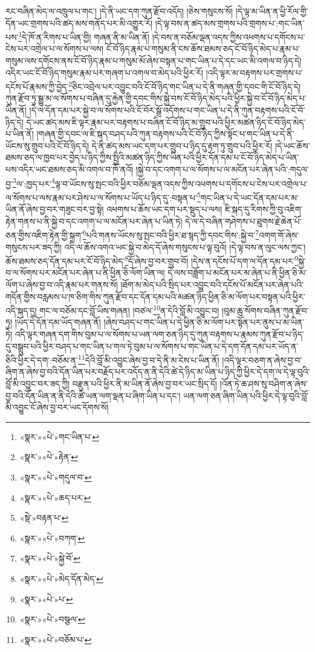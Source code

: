 རང་བཞིན་མེད་ལ་འཁྲུལ་པ་གང་། །དེ་ནི་ཡང་དག་ཀུན་རྫོབ་འདོད། །ཅེས་གསུངས་སོ། །དེ་ལྟ་མ་ཡིན་ན་ཕྱི་རོལ་གྱི་དོན་ཡང་གྲགས་པའི་ཚད་མས་གནོད་པར་མི་འགྱུར་རོ། །དེ་ལྟ་བས་ན་ཚད་མས་གྲགས་པའི་གྲགས་པ་:གང་ཡིན་པས་\footnote{«སྣར་»«པེ་»གང་ཡིན་པ་}དེ་ཁོ་ན་རིགས་པ་ཡིན་གྱི། གཞན་ནི་མ་ཡིན་ནོ། །དེ་བས་ན་བཅོམ་ལྡན་འདས་ཀྱིས་འཕགས་པ་དགོངས་པ་ངེས་པར་འགྲེལ་པ་ལ་སོགས་པ་ལས། ངོ་བོ་ཉིད་རྣམ་པ་གསུམ་ནི་ངས་ཆོས་ཐམས་ཅད་ངོ་བོ་ཉིད་མེད་པ་རྣམ་པ་གསུམ་ལས་དགོངས་ནས་ངོ་བོ་ཉིད་རྣམ་པ་གསུམ་མོ་ཞེས་བསྟན་པ་གང་ཡིན་པ་དེ་དང་ཡང་མི་འགལ་བ་ཉིད་དེ། འདིར་ཡང་ངོ་བོ་ཉིད་གསུམ་རྣམ་པར་གཞག་པ་འགལ་བ་མེད་པའི་ཕྱིར་རོ། །འདི་ལྟར་མ་བརྟགས་པར་གྲགས་པ་དངོས་པོ་རྣམས་ཀྱི་བྱེད་\footnote{«སྣར་»«པེ་»རྟེན་}ཅིང་འབྲེལ་པར་འབྱུང་བའི་ངོ་བོ་ཉིད་གང་ཡིན་པ་དེ་ནི་གཞན་གྱི་དབང་གི་ངོ་བོ་ཉིད་དེ། ཀུན་རྫོབ་ཏུ་སྒྱུ་མ་ལ་སོགས་པ་བཞིན་དུ་རྐྱེན་གྱི་དབང་གིས་སྐྱེ་བས་ངོ་བོ་ཉིད་མེད་པའི་ཕྱིར་སྐྱེ་བ་ངོ་བོ་ཉིད་མེད་པ་ཡིན་ནོ། །དེ་ལ་དོན་དམ་པར་སྐྱེ་བ་ལ་སོགས་པའི་ངོ་བོར་སྒྲོ་འདོགས་པ་གང་ཡིན་པ་དེ་ནི་ཀུན་བརྟགས་པའི་ངོ་བོ་ཉིད་དེ། དེ་ཡང་ཚད་མས་ཇི་ལྟར་རྣམ་པར་བརྟགས་པ་བཞིན་ངོ་བོ་ཉིད་མ་གྲུབ་པའི་ཕྱིར་མཚན་ཉིད་ངོ་བོ་ཉིད་མེད་པ་ཡིན་ནོ། །གཞན་གྱི་དབང་ལ་ཇི་སྐད་བཤད་པའི་ཀུན་བརྟགས་པའི་ངོ་བོ་ཉིད་ཀྱིས་སྟོང་པ་གང་ཡིན་པ་དེ་ནི་ཡོངས་སུ་གྲུབ་པའི་ངོ་བོ་ཉིད་དེ། དེ་ནི་ཚད་མས་ཡང་དག་པར་གྲུབ་པ་ཉིད་དུ་རྟག་ཏུ་གྲུབ་པའི་ཕྱིར་རོ། །དེ་ཡང་ཆོས་ཐམས་ཅད་ལ་ཁྱབ་པར་བྱེད་པ་ཉིད་ཀྱིས་སྤྱིའི་མཚན་ཉིད་ཀྱིས་ཡིན་པའི་ཕྱིར་དོན་དམ་པ་ངོ་བོ་ཉིད་མེད་པ་ཡིན་པས་འདིར་ཡང་ཐམས་ཅད་མི་འགལ་བ་ཁོ་ནའོ། །སྐྱེ་བ་དང་འགག་པ་ལ་སོགས་པ་ལ་མངོན་པར་ཞེན་པའི་:གདུལ་བྱ་\footnote{«སྣར་»«པེ་»གདུལ་བ་}ལ་:ཁྱད་པར་\footnote{«སྣར་»«པེ་»ཆད་པར་}ལྟ་བ་ཡོངས་སུ་སྤང་བའི་ཕྱིར་བཅོམ་ལྡན་འདས་ཀྱིས་འཕགས་པ་དགོངས་པ་ངེས་པར་འགྲེལ་པ་ལ་སོགས་པ་ལས་རྣམ་པར་ཤེས་པ་ལ་སོགས་པ་ཡོད་པ་ཉིད་དུ་:བསྟན་པ་\footnote{«སྡེ་»བརྟན་པ་}གང་ཡིན་པ་དེ་ཡང་དོན་དམ་པར་མ་ཡིན་ནོ་ཞེས་བྱ་བར་གཟུང་བར་བྱ་སྟེ། འཕགས་པ་ཆོས་ཡང་དག་པར་སྡུད་པ་ལས། ཇི་སྐད་དུ་རིགས་ཀྱི་བུ་འཇིག་རྟེན་གནས་པ་ནི་སྐྱེ་བ་དང་འགག་པ་ལ་མངོན་པར་ཞེན་པ་ཡིན་ཏེ། དེ་ལ་དེ་བཞིན་གཤེགས་པ་ཐུགས་རྗེ་ཆེན་པོ་ཅན་གྱིས་འཇིག་རྟེན་གྱི་སྐྲག་\footnote{«སྣར་»«པེ་»བཀག་}པའི་གནས་ཡོངས་སུ་སྤང་བའི་ཕྱིར་ཐ་སྙད་ཀྱི་དབང་གིས་:སྐྱེ་བ་\footnote{«སྣར་»«པེ་»སྐྱེ་བོ་}འགག་གོ་ཞེས་གསུངས་པར་ཟད་ཀྱི། འདི་ལ་ཆོས་འགའ་ཡང་སྐྱེ་བ་མེད་དོ་ཞེས་གསུངས་པ་ལྟ་བུའོ། །དེ་ལྟ་བས་ན་ལུང་ལས་ཀྱང་། ཆོས་ཐམས་ཅད་དོན་དམ་པར་ངོ་བོ་ཉིད་མེད་\footnote{«སྣར་»«པེ་»མེད་དོན་མེད་}དོ་ཞེས་བྱ་བར་གྲུབ་བོ། །དེས་ན་དངོས་པོ་དག་ལ་དོན་དམ་པར་\footnote{«སྣར་»«པེ་»པ་}སྐྱེ་བ་ལ་སོགས་པར་མངོན་པར་ཞེན་པ་ནི་ཕྱིན་ཅི་ལོག་ཡིན་ལ། དེ་ལས་བཟློག་པ་མངོན་པར་མ་ཞེན་པ་ནི་ཕྱིན་ཅི་མ་ལོག་པ་ཞེས་བྱ་བ་འདི་རྣམ་པར་གནས་སོ། །ཐོག་མ་མེད་པའི་སྲིད་པར་འབྱུང་བའི་དངོས་པོ་མངོན་པར་ཞེན་པའི་གདོན་གྱིས་བརླམས་པ་ཁ་ཅིག་གིས་ཀུན་རྫོབ་དང་དོན་དམ་པའི་མཚན་ཉིད་ཕྱིན་ཅི་མ་ལོག་པར་བསྟན་པའི་ཕྱིར་འདི་སྐད་དུ། གང་ལ་བཅོམ་དང་བློ་ཡིས་གཞན། །བཙལ་\footnote{«སྣར་»«པེ་»བསྩལ་}ན་དེའི་བློ་མི་འབྱུང་བ། །བུམ་ཆུ་སོགས་བཞིན་ཀུན་རྫོབ་ཏུ། །ཡོད་དེ་དོན་དམ་ཡོད་གཞན་ནོ། །ཞེས་བཤད་པ་གང་ཡིན་པ་དེ་ཕྱིན་ཅི་མ་ལོག་པར་སྟོན་པར་ནུས་པ་མ་ཡིན་ཏེ། འདི་ལྟར་གཞན་དག་གིས་བུམ་པ་ལ་སོགས་པ་ཡན་ལག་ཅན་ཉིད་དུ་ཀུན་བརྟགས་པ་རྣམས་ཀུན་རྫོབ་པ་ཉིད་དུ་བསྒྲུབ་པའི་ཕྱིར་བཤད་པ་གང་ཡིན་པ་གལ་ཏེ་བུམ་པ་ལ་སོགས་པ་གང་ཡིན་པ་དེ་དག་དོན་དམ་པར་ཡོད་ན་ཅིའི་ཕྱིར་དེ་དག་:བཅོམ་ན་\footnote{«སྣར་»«པེ་»བཅོམ་པ་}དེའི་བློ་མི་འབྱུང་ཞེས་བྱ་བ་དེ་ནི་མ་ངེས་པ་ཡིན་ནོ། །འདི་ལྟར་བཅག་ན་ཞེས་བྱ་བ་ཞིག་ན་ཞེས་བྱ་བའི་དོན་ཡིན་པར་བརྗོད་པར་འདོད་ན་ནི་དེའི་ཚེ་དེ་ཉིད་མ་ཡིན་པ་ཉིད་ཀྱི་ཕྱིར་དེ་དག་ལ་དེ་ལྟ་བུའི་བློ་མི་འབྱུང་བར་ཟད་ཀྱི། བརྫུན་པའི་ཕྱིར་ནི་མ་ཡིན་ནོ་ཞེས་བྱ་བར་ཡང་སྲིད་དོ། །འོན་ཏེ་ཆ་ཤས་སུ་བཤིག་ན་ཞེས་བྱ་བའི་དོན་ཡིན་ན་ནི་དེའི་ཚེ་ཡན་ལག་ལྡན་པ་ཞིག་ཡིན་པ་དང་། ཡན་ལག་ཅན་ཞིག་ཡིན་པའི་ཕྱིར་དེ་ལྟ་བུའི་བློ་མི་འབྱུང་ངོ་ཞེས་བྱ་བར་ཡང་དོགས་སོ། 
